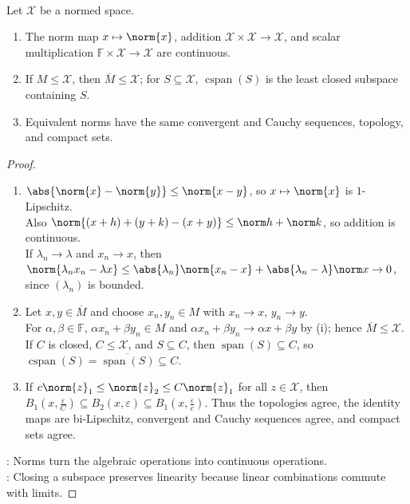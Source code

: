 \begin{proposition} \label{prop:linear-operations-closed-spans-and-equivalent-norms} \\
Let $\mathcal{X}$ be a normed space.
\begin{enumerate}[label=(\roman*)]
\setlength{\itemsep}{0pt}
\item The norm map $x\mapsto\norm{x}$, addition $\mathcal{X}\times\mathcal{X}\to\mathcal{X}$, and scalar multiplication $\mathbb{F}\times\mathcal{X}\to\mathcal{X}$ are continuous.
\item If $M\leq\mathcal{X}$, then $\overline{M}\leq\mathcal{X}$; for $S\subseteq\mathcal{X}$, $\operatorname{cspan}(S)$ is the least closed subspace containing $S$.
\item Equivalent norms have the same convergent and Cauchy sequences, topology, and compact sets.
\end{enumerate}
\begin{proof}
\begin{enumerate}[label=(\roman*)]
\setlength{\itemsep}{0pt}
\item $\abs{\norm{x}-\norm{y}}\leq\norm{x-y}$, so $x\mapsto\norm{x}$ is $1$-Lipschitz.\\
Also $\norm{(x+h)+(y+k)-(x+y)}\leq\norm h+\norm k$, so addition is continuous.\\
If $\lambda_n\to\lambda$ and $x_n\to x$, then $\norm{\lambda_nx_n-\lambda x}\leq\abs{\lambda_n}\norm{x_n-x}+\abs{\lambda_n-\lambda}\norm x\to0$, since $(\lambda_n)$ is bounded.
\item Let $x,y\in\overline M$ and choose $x_n,y_n\in M$ with $x_n\to x$, $y_n\to y$.\\
For $\alpha,\beta\in\mathbb F$, $\alpha x_n+\beta y_n\in M$ and $\alpha x_n+\beta y_n\to\alpha x+\beta y$ by (i); hence $\overline M\leq\mathcal X$.\\
If $C$ is closed, $C\leq\mathcal X$, and $S\subseteq C$, then $\operatorname{span}(S)\subseteq C$, so $\operatorname{cspan}(S)=\overline{\operatorname{span}(S)}\subseteq C$.
\item If $c\norm{z}_1\leq\norm{z}_2\leq C\norm{z}_1$ for all $z\in\mathcal X$, then $B_1(x,\frac{\varepsilon}{C})\subseteq B_2(x,\varepsilon)\subseteq B_1(x,\frac{\varepsilon}{c})$. Thus the topologies agree, the identity maps are bi-Lipschitz, convergent and Cauchy sequences agree, and compact sets agree.
\end{enumerate}
: Norms turn the algebraic operations into continuous operations.\\
: Closing a subspace preserves linearity because linear combinations commute with limits.
\end{proof}
\end{proposition}

